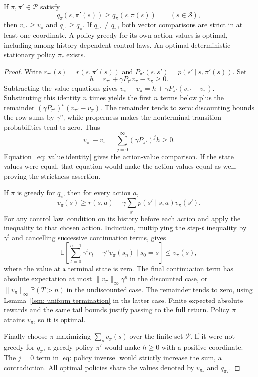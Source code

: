\begin{lemma}\label{thm: strict PIT}
If $\pi,\pi'\in\mathcal P$ satisfy
\begin{equation}\label{eq: PIT condition}
q_\pi(s,\pi'(s))\ge q_\pi(s,\pi(s))\qquad(s\in\mathcal S),
\end{equation}
then $v_{\pi'}\ge v_\pi$ and $q_{\pi'}\ge q_\pi$. If $q_{\pi'}\ne q_\pi$, both vector comparisons are strict in at least one coordinate. A policy greedy for its own action values is optimal, including among history-dependent control laws. An optimal deterministic stationary policy $\pi_*$ exists.
\end{lemma}
\begin{proof}
Write $r_{\pi'}(s)=r(s,\pi'(s))$ and $P_{\pi'}(s,s')=p(s'\mid s,\pi'(s))$. Set
\[
h=r_{\pi'}+\gamma P_{\pi'}v_\pi-v_\pi\ge0.
\]
Subtracting the value equations gives $v_{\pi'}-v_\pi=h+\gamma P_{\pi'}(v_{\pi'}-v_\pi)$. Substituting this identity $n$ times yields the first $n$ terms below plus the remainder $(\gamma P_{\pi'})^n(v_{\pi'}-v_\pi)$. The remainder tends to zero: discounting bounds the row sums by $\gamma^n$, while properness makes the nonterminal transition probabilities tend to zero. Thus
\begin{equation}\label{eq: policy inverse}
v_{\pi'}-v_\pi=\sum_{j=0}^\infty(\gamma P_{\pi'})^j h\ge0.
\end{equation}
Equation~\eqref{eq: value identity} gives the action-value comparison. If the state values were equal, that equation would make the action values equal as well, proving the strictness assertion.

If $\pi$ is greedy for $q_\pi$, then for every action $a$,
\[
v_\pi(s)\ge r(s,a)+\gamma\sum_{s'}p(s'\mid s,a)v_\pi(s').
\]
For any control law, condition on its history before each action and apply the inequality to that chosen action. Induction, multiplying the step-$t$ inequality by $\gamma^t$ and cancelling successive continuation terms, gives
\[
\mathbb E\!\left[\sum_{t=0}^{n-1}\gamma^t r_t+\gamma^n v_\pi(s_n)\mid s_0=s\right]\le v_\pi(s),
\]
where the value at a terminal state is zero. The final continuation term has absolute expectation at most $\|v_\pi\|_\infty\gamma^n$ in the discounted case, or $\|v_\pi\|_\infty\mathbb P(T>n)$ in the undiscounted case. The remainder tends to zero, using Lemma~\ref{lem: uniform termination} in the latter case. Finite expected absolute rewards and the same tail bounds justify passing to the full return. Policy $\pi$ attains $v_\pi$, so it is optimal.

Finally choose $\pi$ maximizing $\sum_s v_\pi(s)$ over the finite set $\mathcal P$. If it were not greedy for $q_\pi$, a greedy policy $\pi'$ would make $h\ge0$ with a positive coordinate. The $j=0$ term in \eqref{eq: policy inverse} would strictly increase the sum, a contradiction. All optimal policies share the values denoted by $v_{\pi_*}$ and $q_{\pi_*}$.
\end{proof}

